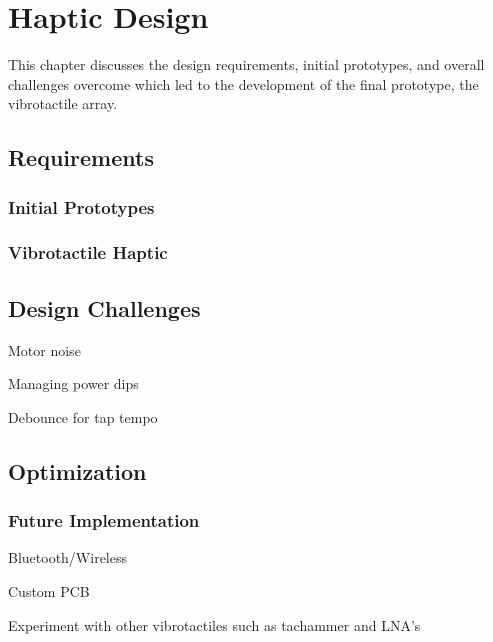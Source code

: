 \chapter{Haptic Design}
This chapter discusses the design requirements, initial prototypes, and overall challenges overcome which led to the development of the final prototype, the vibrotactile array.

\section{Requirements}



\subsection{Initial Prototypes}

\subsection{Vibrotactile Haptic}

\section{Design Challenges}

Motor noise

Managing power dips



Debounce for tap tempo

\section{Optimization}

\subsection{Future Implementation}

Bluetooth/Wireless

Custom PCB

Experiment with other vibrotactiles such as tachammer and LNA's
